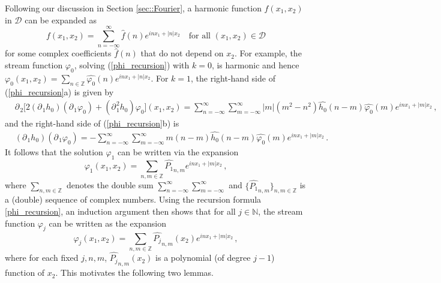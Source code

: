 \documentclass[11pt]{article}
\theoremstyle{plain}
\theoremstyle{definition}
\theoremstyle{definition}
\def\bbN{{\mathbb N}}
\def\bbZ{{\mathbb Z}}
\def\D{{\mathcal D}}
\def\p{\text{\bf\emph{p}}}
\def\ft #1{{\widehat{#1}}}
\def\p{{\partial\hspace{1pt}}}
\begin{document}
Following our discussion in Section \ref{sec::Fourier}, a harmonic function $f(x_1,x_2)$  in $\D$ can be expanded as
$$
f(x_1,x_2) = \sum_{n = - \infty }^ \infty  \ft{f}(n) e^{inx_1 + |n|x_2}\quad\text{for all $(x_1,x_2) \in \D$}
$$
for some complex coefficients $\ft{f}(n)$ that do not depend on $x_2$.   For example, the stream function
$\varphi_0$, solving (\ref{phi_recursion}) with $k=0$, is harmonic and hence
$\varphi_0(x_1,x_2) = \sum\limits_{n\in \bbZ} \ft{\varphi_0}(n) e^{inx_1 + |n|x_2}$.
For $k=1$, the right-hand side of (\ref{phi_recursion}a)   is given by
\begin{align*}
& \p_{\!2}\big[2 (\p_{\!1} h_0) (\p_{\!1} \varphi_0) + (\p_{\!1}^2 h_0) \varphi_0 \big](x_1,x_2) %
= \sum_{n=- \infty }^\infty  \sum_{m=- \infty }^\infty |m| (m^2 - n^2) \ft{h_0}(n-m) \ft{\varphi_0}(m) e^{inx_1 + |m|x_2}\,,
\end{align*}
and the right-hand side of (\ref{phi_recursion}b) is
\begin{align*}
& (\p_{\!1} h_0) (\p_{\!1} \varphi_0) %
= -  \sum_{n=- \infty }^\infty  \sum_{m=- \infty }^\infty m (n-m) \ft{h_0}(n-m) \ft{\varphi_0}(m) e^{in x_1 + |m|x_2}\,.
\end{align*}
It follows that the solution $\varphi_1$ can be written via the expansion
$$
\varphi_1(x_1,x_2) = \sum_{n,m\in\bbZ} \ft{P_1}_{n,m} e^{in x_1 + |m|x_2} \,,
$$
where $ \sum_{n,m\in\bbZ}$ denotes the double sum  $\sum_{n=- \infty }^\infty  \sum_{m=- \infty }^\infty$ and
 $\{\ft{P_1}_{n,m}\}_{n,m\in\bbZ}$ is a (double) sequence of complex numbers.   Using the recursion formula \eqref{phi_recursion},
an induction argument then shows that for all $j\in \bbN$, the stream function $\varphi_j$ can be written as the expansion
$$
\varphi_j(x_1,x_2) = \sum_{n,m\in\bbZ} \ft{P_j}_{n,m}(x_2) e^{in x_1 + |m|x_2}\,,
$$
where for each fixed $j,n,m$,  $\ft{P_j}_{n,m}(x_2)$ is a polynomial  (of degree $j-1$) function of $x_2$.
This motivates the following two lemmas.
\end{document}
